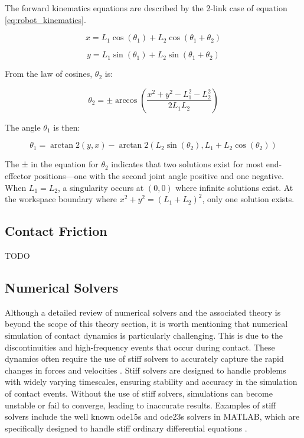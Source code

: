     The forward kinematics equations are described by the 2-link case of equation \ref{eq:robot_kinematics}.
    
    \begin{equation}
    x = L_1 \cos(\theta_1) + L_2 \cos(\theta_1 + \theta_2)
    \end{equation}
    
    \begin{equation}
    y = L_1 \sin(\theta_1) + L_2 \sin(\theta_1 + \theta_2)
    \end{equation}
    
    From the law of cosines, \(\theta_2\) is:
    
    \begin{equation}
    \theta_2 = \pm \arccos\left(\frac{x^2 + y^2 - L_1^2 - L_2^2}{2L_1L_2}\right)
    \end{equation}
    
    The angle \(\theta_1\) is then:
    
    \begin{equation}
    \theta_1 = \arctan2(y,x) - \arctan2(L_2\sin(\theta_2), L_1 + L_2\cos(\theta_2))
    \end{equation}
    
    The ± in the equation for \(\theta_2\) indicates that two solutions exist for most end-effector positions—one with the second joint angle positive and one negative. When \(L_1 = L_2\), a singularity occurs at \((0,0)\) where infinite solutions exist. At the workspace boundary where \(x^2 + y^2 = (L_1 + L_2)^2\), only one solution exists.


\subsection{Contact Friction}
\label{sec:contact_friction}
TODO

\subsection{Numerical Solvers}
\label{sec:numerical_solvers}

Although a detailed review of numerical solvers and the associated theory is beyond the scope of this theory section, it is worth mentioning that numerical simulation of contact dynamics is particularly challenging. This is due to the discontinuities and high-frequency events that occur during contact. These dynamics often require the use of stiff solvers to accurately capture the rapid changes in forces and velocities \cite{stiff_contact_ODE_1}\cite{stiff_contact_ODE_2}. Stiff solvers are designed to handle problems with widely varying timescales, ensuring stability and accuracy in the simulation of contact events. Without the use of stiff solvers, simulations can become unstable or fail to converge, leading to inaccurate results. Examples of stiff solvers include the well known ode15s and ode23s solvers in MATLAB, which are specifically designed to handle stiff ordinary differential equations \cite{MATLAB_ODE}. 


